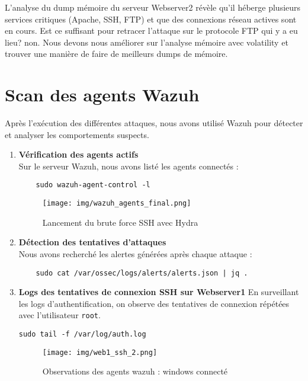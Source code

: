 \documentclass[a4paper,12pt]{report}
\begin{document}
L’analyse du dump mémoire du serveur Webserver2 révèle qu’il héberge plusieurs services critiques (Apache, SSH, FTP) et que des connexions réseau actives sont en cours. Est ce suffisant pour retracer l'attaque sur le protocole FTP qui y a eu lieu? non. Nous devons nous améliorer sur l'analyse mémoire avec volatility et trouver une manière de faire de meilleurs dumps de mémoire. 

\section{Scan des agents Wazuh}

Après l'exécution des différentes attaques, nous avons utilisé Wazuh pour détecter et analyser les comportements suspects.

\begin{enumerate}
    \item \textbf{Vérification des agents actifs}\\
    Sur le serveur Wazuh, nous avons listé les agents connectés :

    \begin{lstlisting}
    sudo wazuh-agent-control -l
    \end{lstlisting}
\begin{figure}[H]
\centering
\texttt{[image: img/wazuh\_agents\_final.png]}
\caption{Lancement du brute force SSH avec Hydra}
\end{figure}

    \item \textbf{Détection des tentatives d'attaques}\\
    Nous avons recherché les alertes générées après chaque attaque :

    \begin{lstlisting}
    sudo cat /var/ossec/logs/alerts/alerts.json | jq .
    \end{lstlisting}

    \item \textbf{Logs des tentatives de connexion SSH sur Webserver1} \newline
En surveillant les logs d’authentification, on observe des tentatives de connexion répétées avec l’utilisateur \texttt{root}.
\begin{lstlisting}
sudo tail -f /var/log/auth.log
\end{lstlisting}
\begin{figure}[H]
    \centering
    \texttt{[image: img/web1\_ssh\_2.png]}
    \caption{Observations des agents wazuh : windows connecté}
\end{figure}


\end{enumerate}
\end{document}
